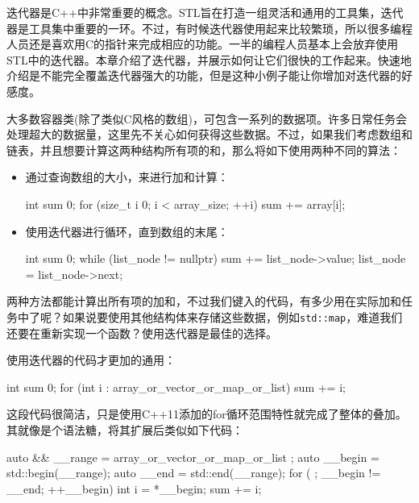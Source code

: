 迭代器是C++中非常重要的概念。STL旨在打造一组灵活和通用的工具集，迭代器是工具集中重要的一环。不过，有时候迭代器使用起来比较繁琐，所以很多编程人员还是喜欢用C的指针来完成相应的功能。一半的编程人员基本上会放弃使用STL中的迭代器。本章介绍了迭代器，并展示如何让它们很快的工作起来。快速地介绍是不能完全覆盖迭代器强大的功能，但是这种小例子能让你增加对迭代器的好感度。

大多数容器类(除了类似C风格的数组)，可包含一系列的数据项。许多日常任务会处理超大的数据量，这里先不关心如何获得这些数据。不过，如果我们考虑数组和链表，并且想要计算这两种结构所有项的和，那么将如下使用两种不同的算法：

\begin{itemize}
\item 通过查询数组的大小，来进行加和计算：

\begin{codebox}[cpp]
int sum {0};
for (size_t i {0}; i < array_size; ++i) { sum += array[i]; }
\end{codebox}

\item 使用迭代器进行循环，直到数组的末尾：

\begin{codebox}[cpp]
int sum {0};
while (list_node != nullptr) {
    sum += list_node->value; list_node = list_node->next;
}
\end{codebox}

\end{itemize}

两种方法都能计算出所有项的加和，不过我们键入的代码，有多少用在实际加和任务中了呢？如果说要使用其他结构体来存储这些数据，例如\texttt{std::map}，难道我们还要在重新实现一个函数？使用迭代器是最佳的选择。

使用迭代器的代码才更加的通用：

\begin{codebox}[cpp]
int sum {0};
for (int i : array_or_vector_or_map_or_list) { sum += i; }
\end{codebox}

这段代码很简洁，只是使用C++11添加的for循环范围特性就完成了整体的叠加。其就像是个语法糖，将其扩展后类似如下代码：

\begin{codebox}[cpp]
{
    auto && __range = array_or_vector_or_map_or_list ;
    auto __begin = std::begin(__range);
    auto __end = std::end(__range);
    for ( ; __begin != __end; ++__begin) {
        int i = *__begin;
        sum += i;
    }
}
\end{codebox}

